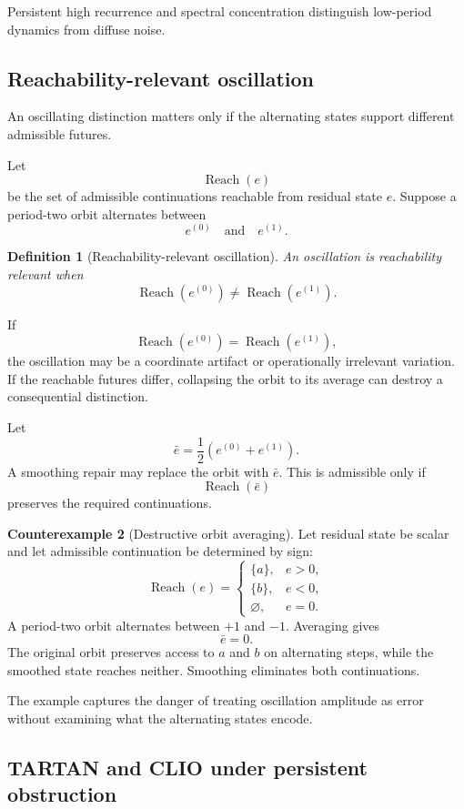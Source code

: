 \documentclass[11pt]{article}
\newtheorem{definition}{Definition}[section]
\theoremstyle{definition}
\newtheorem{counterexample}[definition]{Counterexample}
\DeclareMathOperator{\Reach}{Reach}
\begin{document}
Persistent high recurrence and spectral concentration distinguish low-period dynamics from diffuse noise.

\subsection{Reachability-relevant oscillation}

An oscillating distinction matters only if the alternating states support different admissible futures.

Let
\[
\Reach(e)
\]
be the set of admissible continuations reachable from residual state \(e\). Suppose a period-two orbit alternates between
\[
e^{(0)}
\quad\text{and}\quad
e^{(1)}.
\]

\begin{definition}[Reachability-relevant oscillation]
An oscillation is reachability relevant when
\[
\Reach(e^{(0)})
\neq
\Reach(e^{(1)}).
\]
\end{definition}

If
\[
\Reach(e^{(0)})
=
\Reach(e^{(1)}),
\]
the oscillation may be a coordinate artifact or operationally irrelevant variation. If the reachable futures differ, collapsing the orbit to its average can destroy a consequential distinction.

Let
\[
\bar e
=
\frac12
\left(
e^{(0)}+e^{(1)}
\right).
\]
A smoothing repair may replace the orbit with \(\bar e\). This is admissible only if
\[
\Reach(\bar e)
\]
preserves the required continuations.

\begin{counterexample}[Destructive orbit averaging]
Let residual state be scalar and let admissible continuation be determined by sign:
\[
\Reach(e)
=
\begin{cases}
\{a\}, & e>0,\\
\{b\}, & e<0,\\
\varnothing, & e=0.
\end{cases}
\]
A period-two orbit alternates between \(+1\) and \(-1\). Averaging gives
\[
\bar e=0.
\]
The original orbit preserves access to \(a\) and \(b\) on alternating steps, while the smoothed state reaches neither. Smoothing eliminates both continuations.
\end{counterexample}

The example captures the danger of treating oscillation amplitude as error without examining what the alternating states encode.

\subsection{TARTAN and CLIO under persistent obstruction}
\end{document}
